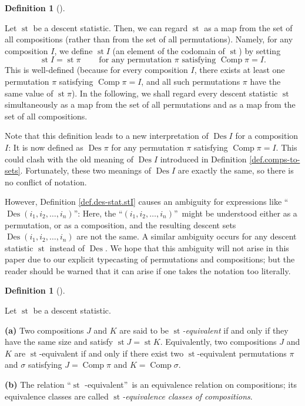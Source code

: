 \documentclass[numbers=enddot,12pt,final,onecolumn,notitlepage]{scrartcl}%
\theoremstyle{definition}
\newtheorem{defi}[theo]{Definition}
\newenvironment{definition}[1][]
{\begin{defi}[#1]\begin{leftbar}}
{\end{leftbar}\end{defi}}
\begin{document}
\begin{definition}
\label{def.des-stat.stI}Let $\operatorname{st}$ be a descent statistic. Then,
we can regard $\operatorname{st}$ as a map from the set of all compositions
(rather than from the set of all permutations). Namely, for any composition
$I$, we define $\operatorname{st}I$ (an element of the codomain of
$\operatorname{st}$) by setting%
\[
\operatorname{st}I=\operatorname{st}\pi\ \ \ \ \ \ \ \ \ \ \text{for any
permutation }\pi\text{ satisfying }\operatorname*{Comp}\pi=I.
\]
This is well-defined (because for every composition $I$, there exists at least
one permutation $\pi$ satisfying $\operatorname*{Comp}\pi=I$, and all such
permutations $\pi$ have the same value of $\operatorname{st}\pi$). In the
following, we shall regard every descent statistic $\operatorname{st}$
simultaneously as a map from the set of all permutations and as a map from the
set of all compositions.
\end{definition}

Note that this definition leads to a new interpretation of
$\operatorname{Des}I$ for a composition $I$: It is now defined as
$\operatorname{Des}\pi$ for any permutation $\pi$ satisfying
$\operatorname*{Comp}\pi=I$. This could clash with the old meaning of
$\operatorname{Des}I$ introduced in Definition \ref{def.comps-to-sets}.
Fortunately, these two meanings of $\operatorname{Des}I$ are exactly the
same, so there is no conflict of notation.

However, Definition \ref{def.des-stat.stI} causes an ambiguity for expressions
like \textquotedblleft$\operatorname{Des}\left(  i_{1},i_{2},\ldots
,i_{n}\right)  $\textquotedblright: Here, the \textquotedblleft$\left(
i_{1},i_{2},\ldots,i_{n}\right)  $\textquotedblright\ might be understood
either as a permutation, or as a composition, and the resulting descent sets
$\operatorname{Des}\left(  i_{1},i_{2},\ldots,i_{n}\right)  $ are not the
same. A similar ambiguity occurs for any descent statistic
$\operatorname{st}$ instead of $\operatorname{Des}$.
We hope that this ambiguity will not arise
in this paper due to our explicit typecasting of permutations and
compositions; but the reader should be warned that it can arise if one takes
the notation too literally.

\begin{definition}
\label{def.des-stat.eq-comp}Let $\operatorname{st}$ be a descent statistic.

\textbf{(a)} Two compositions $J$ and $K$ are said to be
$\operatorname{st}$\textit{-equivalent} if and only if they
have the same size and satisfy
$\operatorname{st}J=\operatorname{st}K$. Equivalently, two compositions $J$
and $K$ are $\operatorname{st}$-equivalent if and only if there exist two
$\operatorname{st}$-equivalent permutations $\pi$ and $\sigma$ satisfying
$J=\operatorname*{Comp}\pi$ and $K=\operatorname*{Comp}\sigma$.

\textbf{(b)} The relation \textquotedblleft$\operatorname{st}$%
-equivalent\textquotedblright\ is an equivalence relation on compositions; its
equivalence classes are called $\operatorname{st}$\textit{-equivalence
classes of compositions}.
\end{definition}
\end{document}
